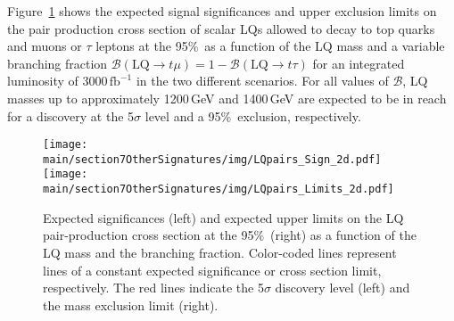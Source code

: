 Figure~\ref{fig:LQpairs:limits2d} shows the expected signal significances and upper exclusion limits on the pair production cross section of scalar LQs allowed to decay to top quarks and muons or $\tau$ leptons at the 95\%~\cl as a function of the LQ mass and a variable branching fraction $\mathcal{B}(\mathrm{LQ}\rightarrow t\mu) = 1 - \mathcal{B}(\mathrm{LQ}\rightarrow t\tau)$ for an integrated luminosity of $3000\,\mathrm{fb}^{-1}$ in the two different scenarios. For all values of $\mathcal{B}$, LQ masses up to approximately 1200\,GeV and 1400\,GeV are expected to be in reach for a discovery at the 5$\sigma$ level and a 95\%~\cl exclusion, respectively.

\begin{figure}[t]
\centering
\texttt{[image: \\main/section7OtherSignatures/img/LQpairs\_Sign\_2d.pdf]}
\texttt{[image: \\main/section7OtherSignatures/img/LQpairs\_Limits\_2d.pdf]}
\caption{Expected significances (left) and expected upper limits on the LQ pair-production cross section at the 95\%~\cl (right) as a function of the LQ mass and the branching fraction. Color-coded lines represent lines of a constant expected significance or cross section limit, respectively. The red lines indicate the 5$\sigma$ discovery level (left) and the mass exclusion limit (right).}
\label{fig:LQpairs:limits2d}
\end{figure}